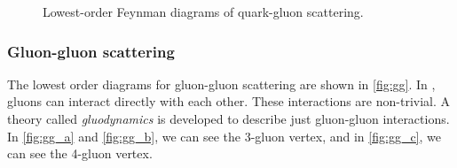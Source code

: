 \begin{figure}[htb]
\begin{subfigure}[t]{0.29\textwidth}
        \caption{}
        \label{fig:qg_c}
    \end{subfigure}
    \caption{Lowest-order Feynman diagrams of quark-gluon scattering.}
    \label{fig:qg}
\end{figure}

\subsubsection*{Gluon-gluon scattering}
The lowest order diagrams for gluon-gluon scattering are shown in \cref{fig:gg}.
In \QCD, gluons can interact directly with each other.
These interactions are non-trivial. 
A theory called \emph{gluodynamics} is developed to describe just gluon-gluon interactions.
In \cref{fig:gg_a} and \cref{fig:gg_b}, we can see the 3-gluon vertex, and in \cref{fig:gg_c}, we can see the 4-gluon vertex.


